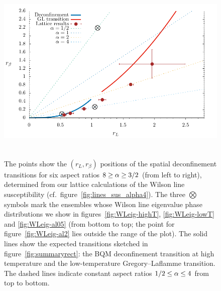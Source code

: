 \begin{figure}[tbp]
  \centering
  \includegraphics[height=9cm]{Figures/crit.pdf}
  \caption{\label{fig:crit}The points show the $(r_L, r_{\beta})$ positions of the spatial deconfinement transitions for six aspect ratios $8 \geq \alpha \geq 3 / 2$ (from left to right), determined from our lattice calculations of the Wilson line susceptibility (cf.\ figure~\protect\ref{fig:lines_sus_alpha4}).  The three $\bigotimes$ symbols mark the ensembles whose Wilson line eigenvalue phase distributions we show in figures~\protect\ref{fig:WLeig-highT}, \protect\ref{fig:WLeig-lowT} and \protect\ref{fig:WLeig-al05} (from bottom to top; the point for figure~\protect\ref{fig:WLeig-al2} lies outside the range of the plot).  The solid lines show the expected transitions sketched in figure~\protect\ref{fig:summaryrect}: the BQM deconfinement transition at high temperature and the low-temperature Gregory--Laflamme transition.  The dashed lines indicate constant aspect ratios $1 / 2 \leq \alpha \leq 4$ from top to bottom.}
\end{figure}

